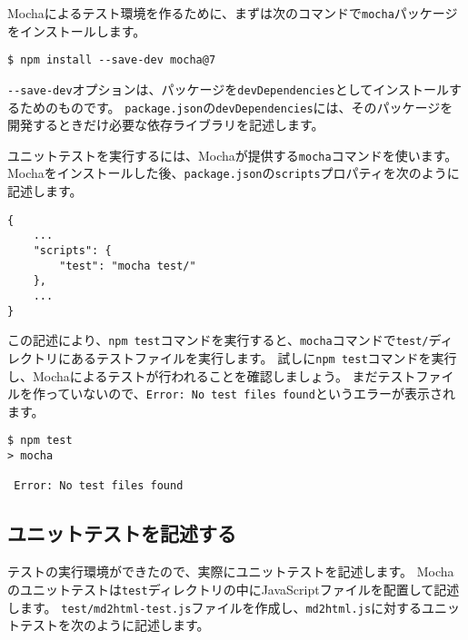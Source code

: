 Mochaによるテスト環境を作るために、まずは次のコマンドで\texttt{mocha}パッケージをインストールします。

\begin{lstlisting}
$ npm install --save-dev mocha@7
\end{lstlisting}

\texttt{-\/-save-dev}オプションは、パッケージを\texttt{devDependencies}としてインストールするためのものです。
\texttt{package.json}の\texttt{devDependencies}には、そのパッケージを開発するときだけ必要な依存ライブラリを記述します。

ユニットテストを実行するには、Mochaが提供する\texttt{mocha}コマンドを使います。
Mochaをインストールした後、\texttt{package.json}の\texttt{scripts}プロパティを次のように記述します。

\begin{lstlisting}
{
    ...
    "scripts": {
        "test": "mocha test/"
    },
    ...
}
\end{lstlisting}

この記述により、\texttt{npm test}コマンドを実行すると、\texttt{mocha}コマンドで\texttt{test/}ディレクトリにあるテストファイルを実行します。
試しに\texttt{npm test}コマンドを実行し、Mochaによるテストが行われることを確認しましょう。
まだテストファイルを作っていないので、\texttt{Error: No test files found}というエラーが表示されます。

\begin{lstlisting}
$ npm test
> mocha

 Error: No test files found
\end{lstlisting}

\hypertarget{write-unit-test}{%
\subsection{ユニットテストを記述する}\label{write-unit-test}}

テストの実行環境ができたので、実際にユニットテストを記述します。
Mochaのユニットテストは\texttt{test}ディレクトリの中にJavaScriptファイルを配置して記述します。
\texttt{test/md2html-test.js}ファイルを作成し、\texttt{md2html.js}に対するユニットテストを次のように記述します。

